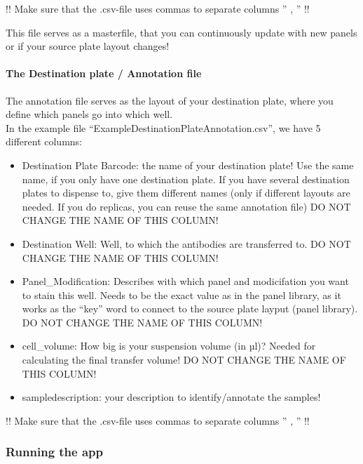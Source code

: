 \documentclass[
]{article}
\providecommand{\tightlist}{%
  \setlength{\itemsep}{0pt}\setlength{\parskip}{0pt}}
\begin{document}
!! Make sure that the .csv-file uses commas to separate columns '' , ''
!!

This file serves as a masterfile, that you can continuously update with
new panels or if your source plate layout changes!

\hypertarget{the-destination-plate-annotation-file}{%
\paragraph{The Destination plate / Annotation
file}\label{the-destination-plate-annotation-file}}

The annotation file serves as the layout of your destination plate,
where you define which panels go into which well.\\
In the example file ``ExampleDestinationPlateAnnotation.csv'', we have 5
different columns:

\begin{itemize}
\tightlist
\item
  Destination Plate Barcode: the name of your destination plate! Use the
  same name, if you only have one destination plate. If you have several
  destination plates to dispense to, give them different names (only if
  different layouts are needed. If you do replicas, you can reuse the
  same annotation file) DO NOT CHANGE THE NAME OF THIS COLUMN!\\
\item
  Destination Well: Well, to which the antibodies are transferred to. DO
  NOT CHANGE THE NAME OF THIS COLUMN!\\
\item
  Panel\_Modification: Describes with which panel and modicifation you
  want to stain this well. Needs to be the exact value as in the panel
  library, as it works as the ``key'' word to connect to the source
  plate layput (panel library). DO NOT CHANGE THE NAME OF THIS COLUMN!\\
\item
  cell\_volume: How big is your suspension volume (in µl)? Needed for
  calculating the final transfer volume! DO NOT CHANGE THE NAME OF THIS
  COLUMN!\\
\item
  sampledescription: your description to identify/annotate the samples!
\end{itemize}

!! Make sure that the .csv-file uses commas to separate columns '' , ''
!!

\hypertarget{running-the-app}{%
\subsubsection{Running the app}\label{running-the-app}}
\end{document}
